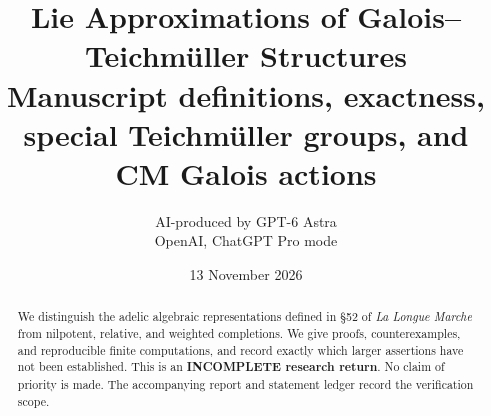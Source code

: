 \documentclass[11pt,a4paper]{article}
\title{Lie Approximations of Galois--Teichm\"uller Structures\\
\large Manuscript definitions, exactness, special Teichm\"uller groups, and CM Galois actions}
\author{AI-produced by GPT-6 Astra\\OpenAI, ChatGPT Pro mode}
\date{13 November 2026}
\begin{document}
\maketitle
\begin{abstract}
We distinguish the adelic algebraic representations defined in \S52 of
\emph{La Longue Marche} from nilpotent, relative, and weighted completions.
We give proofs, counterexamples, and reproducible finite computations, and
record exactly which larger assertions have not been established.
This is an \textbf{INCOMPLETE research return}. No claim of priority is made.
The accompanying report and statement ledger record the verification scope.
\end{abstract}

\tableofcontents
\clearpage
{}


\end{document}
